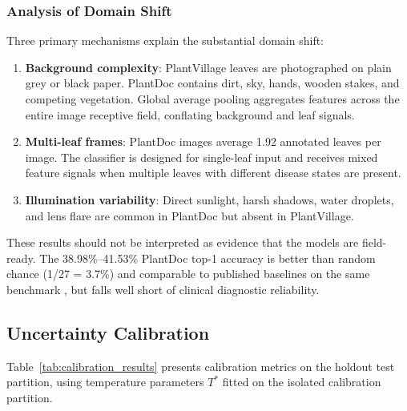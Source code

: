 \documentclass[pdflatex,sn-mathphys-num]{sn-jnl}
\begin{document}
\subsubsection{Analysis of Domain Shift}

Three primary mechanisms explain the substantial domain shift:
\begin{enumerate}
  \item \textbf{Background complexity}: PlantVillage leaves are photographed on plain
        grey or black paper. PlantDoc contains dirt, sky, hands, wooden stakes, and
        competing vegetation. Global average pooling aggregates features across the
        entire image receptive field, conflating background and leaf signals.
  \item \textbf{Multi-leaf frames}: PlantDoc images average 1.92 annotated leaves per
        image. The classifier is designed for single-leaf input and receives mixed
        feature signals when multiple leaves with different disease states are present.
  \item \textbf{Illumination variability}: Direct sunlight, harsh shadows, water
        droplets, and lens flare are common in PlantDoc but absent in PlantVillage.
\end{enumerate}

These results should not be interpreted as evidence that the models are field-ready.
The 38.98\%--41.53\% PlantDoc top-1 accuracy is better than random chance (1/27 = 3.7\%)
and comparable to published baselines on the same benchmark
\citep{singh2020plant,dsouza2021generalization}, but falls well short of clinical
diagnostic reliability.

\subsection{Uncertainty Calibration}
\label{sec:results_calibration}

Table~\ref{tab:calibration_results} presents calibration metrics on the holdout test
partition, using temperature parameters $T^*$ fitted on the isolated calibration
partition.
\end{document}
